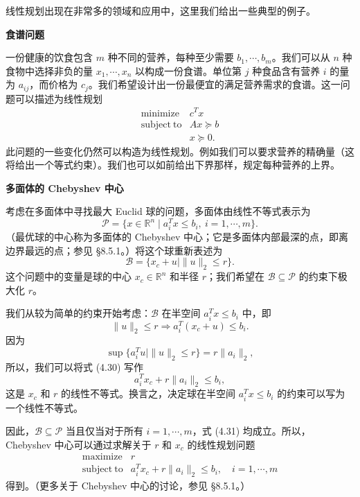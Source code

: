 \documentclass[UTF8,12pt,a4paper,fontset=fandol]{ctexart}
\begin{document}
线性规划出现在非常多的领域和应用中，这里我们给出一些典型的例子。

\noindent\textbf{食谱问题}

一份健康的饮食包含 $m$ 种不同的营养，每种至少需要 $b_1,\cdots,b_m$。我们可以从 $n$ 种食物中选择非负的量 $x_1,\cdots,x_n$ 以构成一份食谱。单位第 $j$ 种食品含有营养 $i$ 的量为 $a_{ij}$，而价格为 $c_j$。我们希望设计出一份最便宜的满足营养需求的食谱。这一问题可以描述为线性规划
\[
\begin{array}{ll}
\mathop{\mathrm{minimize}} & c^Tx\\
\mathrm{subject\ to} & Ax\succeq b\\
& x\succeq 0.
\end{array}
\]
此问题的一些变化仍然可以构造为线性规划。例如我们可以要求营养的精确量（这将给出一个等式约束）。我们也可以如前给出下界那样，规定每种营养的上界。

\noindent\textbf{多面体的 Chebyshev 中心}

考虑在多面体中寻找最大 Euclid 球的问题，多面体由线性不等式表示为
\[
\mathcal{P}=\{x\in\mathbb{R}^n\mid a_i^Tx\leq b_i,\ i=1,\cdots,m\}.
\]
（最优球的中心称为多面体的 Chebyshev 中心；它是多面体内部最深的点，即离边界最远的点；参见 §8.5.1。）将这个球重新表述为
\[
\mathcal{B}=\{x_c+u\mid \|u\|_2\leq r\}.
\]
这个问题中的变量是球的中心 $x_c\in\mathbb{R}^n$ 和半径 $r$；我们希望在 $\mathcal{B}\subseteq\mathcal{P}$ 的约束下极大化 $r$。

我们从较为简单的约束开始考虑：$\mathcal{B}$ 在半空间 $a_i^Tx\leq b_i$ 中，即
\begin{equation}
\|u\|_2\leq r\Longrightarrow a_i^T(x_c+u)\leq b_i.
\tag{4.30}
\end{equation}
因为
\[
\sup\{a_i^Tu\mid \|u\|_2\leq r\}=r\|a_i\|_2,
\]
所以，我们可以将式 (4.30) 写作
\begin{equation}
a_i^Tx_c+r\|a_i\|_2\leq b_i,
\tag{4.31}
\end{equation}
这是 $x_c$ 和 $r$ 的线性不等式。换言之，决定球在半空间 $a_i^Tx\leq b_i$ 的约束可以写为一个线性不等式。

因此，$\mathcal{B}\subseteq\mathcal{P}$ 当且仅当对于所有 $i=1,\cdots,m$，式 (4.31) 均成立。所以，Chebyshev 中心可以通过求解关于 $r$ 和 $x_c$ 的线性规划问题
\[
\begin{array}{ll}
\mathop{\mathrm{maximize}} & r\\
\mathrm{subject\ to} & a_i^Tx_c+r\|a_i\|_2\leq b_i,\quad i=1,\cdots,m
\end{array}
\]
得到。（更多关于 Chebyshev 中心的讨论，参见 §8.5.1。）
\end{document}

